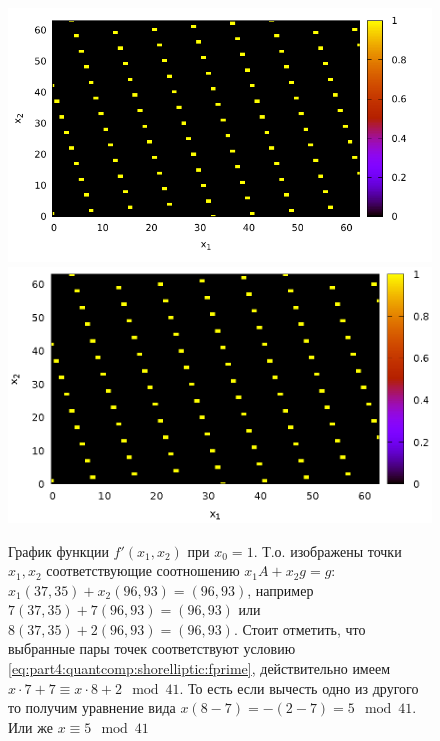 \begin{figure}
\centering

\ifpdf
\includegraphics[angle=0]
{./part4/quantcomp/picellipticdiscretlog1.pdf}
\else
\includegraphics[angle=0]
{./part4/quantcomp/picellipticdiscretlog1.eps}
\fi

%



\caption{График функции 
$f'(x_1, x_2)$ при $x_0 = 1$. Т.о. изображены точки $x_1, x_2$
  соответствующие соотношению $x_1 A + x_2 g = g$: 
  $x_1 (37, 35) + x_2 (96,93) = (96,93)$, например
  $7 (37, 35) + 7 (96,93) = (96,93)$ или $8 (37, 35) + 2 (96,93) =
  (96,93)$. Стоит отметить, что выбранные пары точек соответствуют
  условию \eqref{eq:part4:quantcomp:shorelliptic:fprime}, действительно
 имеем $x \cdot 7 + 7 \equiv x \cdot 8 + 2 \mod 41$. 
 То есть если вычесть одно из другого то
 получим уравнение вида $x \left(8-7\right) = - (2 - 7) = 5 \mod 41$.
 Или же $x \equiv 5 \mod 41$} 
\label{fig:part4:quantcomp:dle1}
\end{figure}
